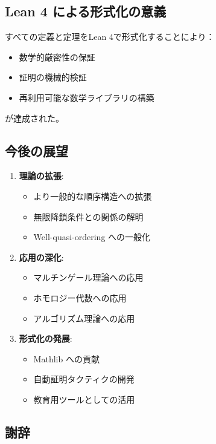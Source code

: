 \documentclass[a4paper,12pt]{ltjsarticle}
\begin{document}
\subsection{Lean 4 による形式化の意義}

すべての定義と定理をLean 4で形式化することにより：
\begin{itemize}
    \item 数学的厳密性の保証
    \item 証明の機械的検証
    \item 再利用可能な数学ライブラリの構築
\end{itemize}

が達成された。

\subsection{今後の展望}

\begin{enumerate}
    \item \textbf{理論の拡張}:
    \begin{itemize}
        \item より一般的な順序構造への拡張
        \item 無限降鎖条件との関係の解明
        \item Well-quasi-ordering への一般化
    \end{itemize}

    \item \textbf{応用の深化}:
    \begin{itemize}
        \item マルチンゲール理論への応用
        \item ホモロジー代数への応用
        \item アルゴリズム理論への応用
    \end{itemize}

    \item \textbf{形式化の発展}:
    \begin{itemize}
        \item Mathlib への貢献
        \item 自動証明タクティクの開発
        \item 教育用ツールとしての活用
    \end{itemize}
\end{enumerate}

\subsection{謝辞}
\end{document}

